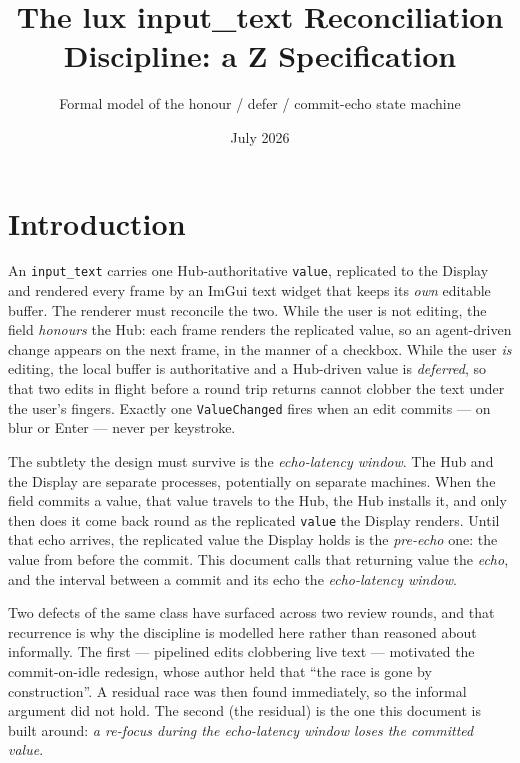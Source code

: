 \documentclass[a4paper,10pt,fleqn]{article}
\begin{document}
\title{The lux input\_text Reconciliation Discipline: a Z Specification}
\author{Formal model of the honour / defer / commit-echo state machine}
\date{July 2026}
\maketitle

\section{Introduction}

An \texttt{input\_text} carries one Hub-authoritative \texttt{value}, replicated
to the Display and rendered every frame by an ImGui text widget that keeps its
\emph{own} editable buffer.  The renderer must reconcile the two.  While the
user is not editing, the field \emph{honours} the Hub: each frame renders the
replicated value, so an agent-driven change appears on the next frame, in the
manner of a checkbox.  While the user \emph{is} editing, the local buffer is
authoritative and a Hub-driven value is \emph{deferred}, so that two edits in
flight before a round trip returns cannot clobber the text under the user's
fingers.  Exactly one \texttt{ValueChanged} fires when an edit commits --- on
blur or Enter --- never per keystroke.

The subtlety the design must survive is the \emph{echo-latency window}.  The
Hub and the Display are separate processes, potentially on separate machines.
When the field commits a value, that value travels to the Hub, the Hub installs
it, and only then does it come back round as the replicated \texttt{value} the
Display renders.  Until that echo arrives, the replicated value the Display
holds is the \emph{pre-echo} one: the value from before the commit.  This
document calls that returning value the \emph{echo}, and the interval between a
commit and its echo the \emph{echo-latency window}.

Two defects of the same class have surfaced across two review rounds, and that
recurrence is why the discipline is modelled here rather than reasoned about
informally.  The first --- pipelined edits clobbering live text --- motivated
the commit-on-idle redesign, whose author held that ``the race is gone by
construction''.  A residual race was then found immediately, so the informal
argument did not hold.  The second (the residual) is the one this document is
built around: \emph{a re-focus during the echo-latency window loses the
committed value}.
\end{document}
